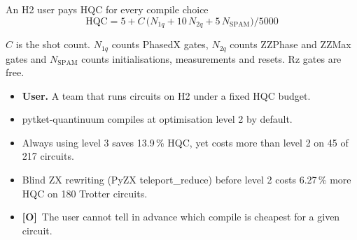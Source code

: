 \documentclass[aspectratio=169,11pt]{beamer}
\newcommand{\Otag}{{\color{opinion}\textbf{[O]}}}
\begin{document}
\begin{frame}{An H2 user pays HQC for every compile choice}
  \small
  \[ \mathrm{HQC} = 5 + C\,\bigl(N_{1q} + 10\,N_{2q} + 5\,N_{\mathrm{SPAM}}\bigr) / 5000 \]
  {\footnotesize\color{muted}$C$ is the shot count. $N_{1q}$ counts PhasedX gates, $N_{2q}$ counts ZZPhase and ZZMax gates and $N_{\mathrm{SPAM}}$ counts initialisations, measurements and resets. Rz gates are free.\par}
  \medskip
  \begin{itemize}\setlength{\itemsep}{4pt}
    \item \textbf{User.} A team that runs circuits on H2 under a fixed HQC budget.
    \item pytket-quantinuum compiles at optimisation level 2 by default.
    \item Always using level 3 saves 13.9\,\% HQC, yet costs more than level 2 on 45 of 217 circuits.
    \item Blind ZX rewriting (PyZX teleport\_reduce) before level 2 costs 6.27\,\% more HQC on 180 Trotter circuits.
    \item \Otag\ The user cannot tell in advance which compile is cheapest for a given circuit.
  \end{itemize}
\end{frame}
\end{document}
